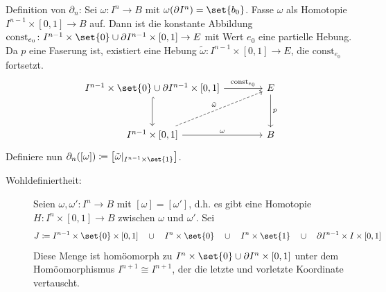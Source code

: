 \begin{beweis}
	Definition von $\partial_n$: Sei $\omega \colon I^n \to B$ mit $\omega(\partial I^n) = \set{b_0}$. 
	Fasse $\omega$ als Homotopie $I^{n-1} \times [0,1] \to B$ auf.
	Dann ist die konstante Abbildung $\mathrm{const}_{e_0} \colon I^{n-1} \times \set{0} \cup \partial I^{n-1} \times [0,1] \to E$ mit Wert $e_0$ eine partielle Hebung.
	Da $p$ eine Faserung ist, existiert eine Hebung $\tilde{\omega} \colon I^{n-1} \times [0,1] \to E$, die $\mathrm{const}_{e_0}$ fortsetzt.
	\[
		\begin{tikzcd}[row sep=3em, column sep=4em]
			I^{n-1} \times \set{0} \cup \partial I^{n-1} \times [0,1] \rar["\mathrm{const}_{e_0}"] \dar[hook]& E \dar["p"] \\
			I^{n-1} \times [0,1] \rar["\omega"] \urar[dashed,"\tilde{\omega}"]& B 
		\end{tikzcd}
	\]
	Definiere nun $\partial_n([\omega]) \coloneqq \benbrace*{\tilde{\omega}|_{I^{n-1} \times \set{1}}}$.
	\begin{description}
		\item[Wohldefiniertheit:] Seien $\omega, \omega' \colon I^n \to B$ mit $[\omega]=[\omega']$, d.h. es gibt eine Homotopie $H \colon I^n \times [0,1] \to B$ zwischen $\omega$ und $\omega'$. Sei 
		\[
			J \coloneqq I^{n-1} \times \set{0} \times [0,1] \quad \cup \quad I^n \times\set{0}\quad\cup\quad I^n \times\set{1}\quad \cup \quad \partial I^{n-1} \times I \times [0,1]  
		\]
		Diese Menge ist homöomorph zu $I^n \times \set{0} \cup \partial I^n \times [0,1]$ unter dem Homöomorphismus $I^{n+1} \cong I^{n+1}$, der die letzte und vorletzte Koordinate vertauscht.
		\begin{figure}[htbp]
\end{figure}
\end{description}
\end{beweis}
